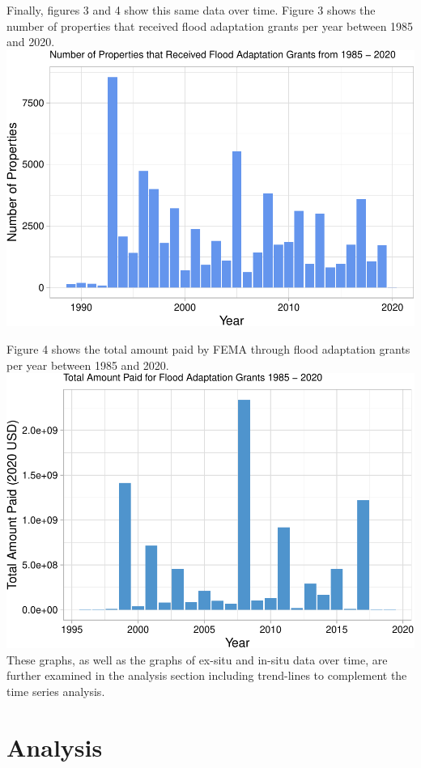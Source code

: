 \documentclass[
  12pt,
]{article}
\begin{document}
Finally, figures 3 and 4 show this same data over time. Figure 3 shows
the number of properties that received flood adaptation grants per year
between 1985 and 2020. \newline
\includegraphics{finalreport_files/figure-latex/unnamed-chunk-7-1.pdf}

Figure 4 shows the total amount paid by FEMA through flood adaptation
grants per year between 1985 and 2020. \newline
\includegraphics{finalreport_files/figure-latex/unnamed-chunk-8-1.pdf}
\newline These graphs, as well as the graphs of ex-situ and in-situ data
over time, are further examined in the analysis section including
trend-lines to complement the time series analysis.

\newpage

\hypertarget{analysis}{%
\section{Analysis}\label{analysis}}
\end{document}
